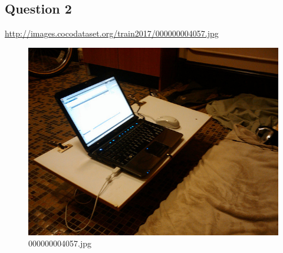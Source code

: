 \subsection*{Question 2}
\url{http://images.cocodataset.org/train2017/000000004057.jpg}
    \begin{figure}[h]
        \centering
        \includegraphics[width=0.8\linewidth]{../image set/easy/000000004057.jpg}
        \caption{000000004057.jpg}
    \end{figure}
